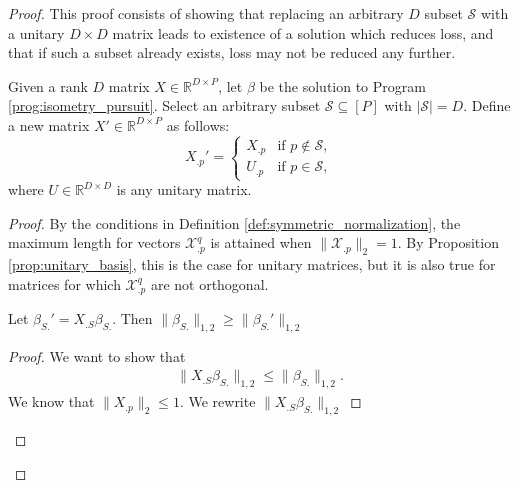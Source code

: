  \begin{proof}
 

This proof consists of showing that replacing an arbitrary $D$ subset $\mathcal S$ with a unitary $D \times D$ matrix leads to existence of a solution which reduces loss, and that if such a subset already exists, loss may not be reduced any further.

\begin{proposition}
Given a rank $D$ matrix $X \in \mathbb{R}^{D \times P}$, let $\beta$ be the solution to Program \ref{prog:isometry_pursuit}.
Select an arbitrary subset $\mathcal{S} \subseteq [P]$ with $|\mathcal{S}| = D$.
Define a new matrix $X' \in \mathbb{R}^{D \times P}$ as follows:
\[
X_{.p}' = \begin{cases} 
X_{.p} & \text{if } p \notin \mathcal{S}, \\
U_{.p} & \text{if } p \in \mathcal{S},
\end{cases}
\]
where $U \in \mathbb{R}^{D \times D}$ is any unitary matrix.
\end{proposition}

\begin{proof}
By the conditions in Definition  \ref{def:symmetric_normalization}, the maximum length for vectors $\mathcal X^q_{.p}$ is attained when $\|\mathcal X_{.p}\|_2 = 1$.
By Proposition \ref{prop:unitary_basis}, this is the case for unitary matrices, but it is also true for matrices for which $\mathcal X^q_{.p}$ are not orthogonal.


\begin{proposition}
\label{prop:support_orthogonalization}
Let $\beta_{S.}' = X_{.S} \beta_{S.}$.
Then $\|\beta_{S.}\|_{1,2} \geq \|\beta_{S.}'\|_{1,2}$
\end{proposition}
\begin{proof}
We want to show that 
\begin{align}
\| X_{.S} \beta_{S.}  \|_{1,2} \leq \|\beta_{S.}\|_{1,2}.
\end{align}
We know that $\| X_{.p} \|_2 \leq 1.$
We rewrite $\| X_{.S} \beta_{S.}  \|_{1,2} $


\end{proof}
\end{proof}
\end{proof}
